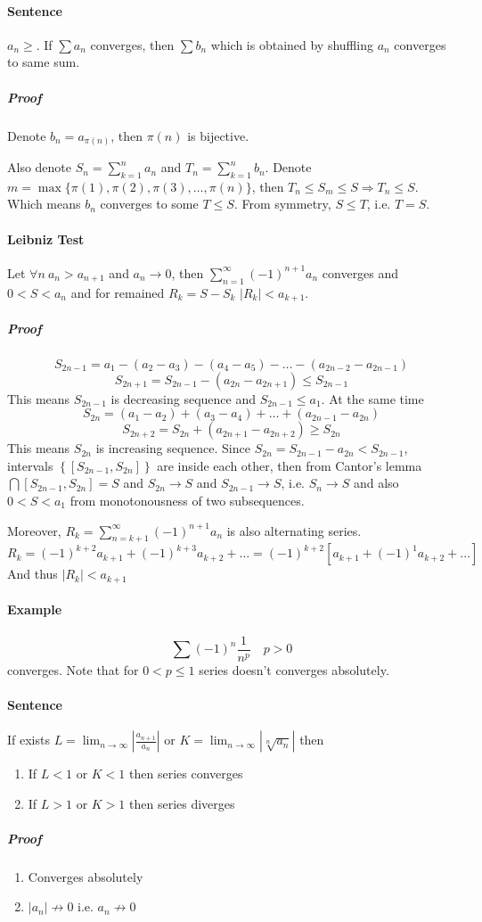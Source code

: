 \paragraph{Sentence} $a_n \geq$. If $\sum a_n$ converges, then $\sum b_n$ which is obtained by shuffling $a_n$ converges to same sum.
\subparagraph{Proof}
Denote $b_n = a_{\pi(n)}$, then $\pi(n)$ is bijective.

Also denote $S_n = \sum_{k=1}^n a_n$ and $T_n = \sum_{k=1}^n b_n$. Denote $m = \max \big\{ \pi(1),\pi(2), \pi(3), \dots, \pi(n) \big\}$, then $T_n \leq S_m \leq S \Rightarrow T_n \leq S$. Which means $b_n$ converges to some $T \leq S$. From symmetry, $S \leq T$, i.e. $T=S$.
\paragraph{Leibniz Test} Let $\forall n \: a_n > a_{n+1}$ and $a_n \to 0$, then $\sum_{n=1}^\infty \left(-1\right)^{n+1} a_n$ converges and $0 < S < a_n$ and for remained $R_k = S - S_k$  $|R_k| < a_{k+1}$.
\subparagraph{Proof}
$$S_{2n-1} = a_1 - (a_2-a_3) - (a_4-a_5) - \dots - (a_{2n-2}-a_{2n-1})$$
$$S_{2n+1} = S_{2n-1} - (a_{2n}-a_{2n+1}) \leq S_{2n-1}$$
This means $S_{2n-1}$ is decreasing sequence and $S_{2n-1} \leq a_1$.
At the same time
$$S_{2n} = (a_1-a_2)+(a_3-a_4)+\dots+(a_{2n-1}-a_{2n})$$
$$S_{2n+2} = S_{2n}+(a_{2n+1}-a_{2n+2}) \geq S_{2n}$$
This means $S_{2n}$ is increasing sequence. Since $S_{2n} =S_{2n-1}-a_{2n} < S_{2n-1}$, intervals $\left\{ \left[ S_{2n-1}, S_{2n} \right] \right\}$ are inside each other, then from Cantor's lemma $\bigcap \left[ S_{2n-1}, S_{2n} \right] = S$ and $S_{2n} \to S$ and $S_{2n-1} \to S$, i.e. $S_n \to S$ and also $0<S<a_1$ from monotonousness of two subsequences.

Moreover, $R_k = \sum_{n=k+1}^{\infty} (-1)^{n+1}a_n$ is also alternating series.
$$R_k = (-1)^{k+2}a_{k+1} + (-1)^{k+3}a_{k+2} + \dots = (-1)^{k+2}\left[a_{k+1} + (-1)^{1}a_{k+2} + \dots\right]$$
And thus $|R_k| < a_{k+1}$
\paragraph{Example}
$$\sum (-1)^n \frac{1}{n^p} \quad p>0$$
converges. Note that for $0 < p \leq 1$ series doesn't converges absolutely.
\paragraph{Sentence}
If exists $L = \lim_{n\to \infty} \left| \frac{a_{n+1}}{a_n} \right|$ or $K = \lim_{n\to \infty} \left| \sqrt[n]{a_n} \right|$ then
\begin{enumerate}
	\item If $L<1$ or $K<1$ then series converges
	\item If $L >1$ or $K>1$ then series diverges
\end{enumerate}
\subparagraph{Proof}
\begin{enumerate}
	\item Converges absolutely
	\item $|a_n| \not \to 0$ i.e. $a_n \not \to 0$
\end{enumerate}